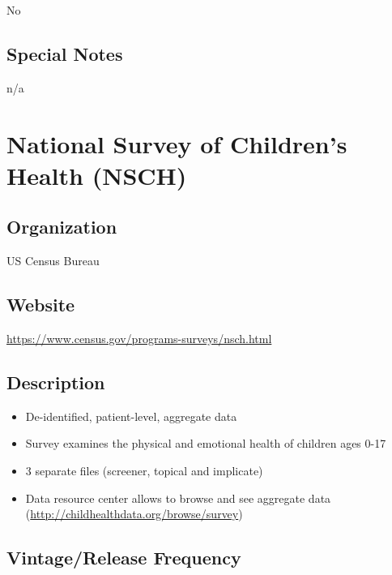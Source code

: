 \documentclass[
]{book}
\providecommand{\tightlist}{%
  \setlength{\itemsep}{0pt}\setlength{\parskip}{0pt}}
\begin{document}
No

\hypertarget{special-notes-60}{%
\section{Special Notes}\label{special-notes-60}}

n/a

\mainmatter

\hypertarget{national-survey-of-childrens-health-nsch}{%
\chapter{National Survey of Children's Health (NSCH)}\label{national-survey-of-childrens-health-nsch}}

\hypertarget{organization-61}{%
\section{Organization}\label{organization-61}}

US Census Bureau

\hypertarget{website-61}{%
\section{Website}\label{website-61}}

\url{https://www.census.gov/programs-surveys/nsch.html}

\hypertarget{description-61}{%
\section{Description}\label{description-61}}

\begin{itemize}
\tightlist
\item
  De-identified, patient-level, aggregate data
\item
  Survey examines the physical and emotional health of children ages 0-17
\item
  3 separate files (screener, topical and implicate)
\item
  Data resource center allows to browse and see aggregate data (\url{http://childhealthdata.org/browse/survey})
\end{itemize}

\hypertarget{vintagerelease-frequency-61}{%
\section{Vintage/Release Frequency}\label{vintagerelease-frequency-61}}
\end{document}

